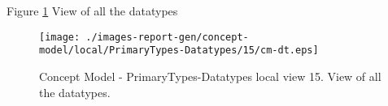 Figure \ref{fig:lu.uni.lassy.excalibur.group09.spec-CM-view-local-PrimaryTypes-Datatypes-15} View of all the datatypes



\begin{figure}[htbp] 
\label{fig:lu.uni.lassy.excalibur.group09.spec-CM}
\begin{center}
\texttt{[image: ./images-report-gen/concept-model/local/PrimaryTypes-Datatypes/15/cm-dt.eps]}
\end{center}
\caption[Concept Model - PrimaryTypes-Datatypes local view 15 - View of all the datatypes]{Concept Model - PrimaryTypes-Datatypes local view 15. View of all the datatypes.}
\label{fig:lu.uni.lassy.excalibur.group09.spec-CM-view-local-PrimaryTypes-Datatypes-15}
\end{figure}
\vspace{0.5cm} 
